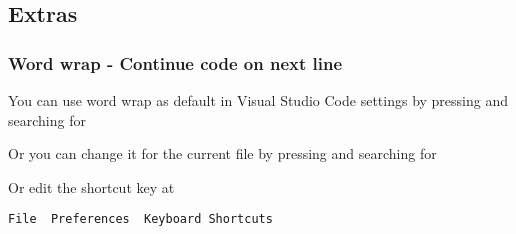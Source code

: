 \subsection{Extras}

\subsubsection{Word wrap - Continue code on next line}

You can use word wrap as default in Visual Studio Code settings by pressing  and searching for 


Or you can change it for the current file by pressing  and searching for


Or edit the shortcut key at 

\texttt{File \ra\ Preferences \ra\ Keyboard Shortcuts}